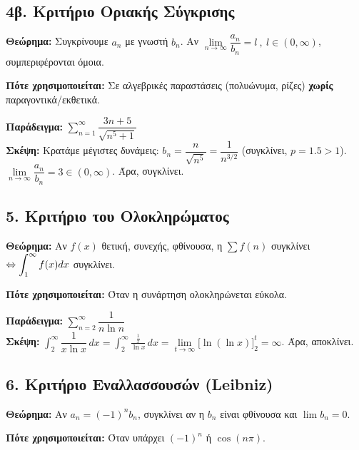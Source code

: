 \documentclass[11pt,a4paper]{article}
\newcommand{\eng}[1]{\selectlanguage{english}#1\selectlanguage{greek}}
\begin{document}
\subsection*{4β. Κριτήριο Οριακής Σύγκρισης}
\textbf{Θεώρημα:} Συγκρίνουμε $a_n$ με γνωστή $b_n$. Αν $\lim\limits_{n \to \infty} \dfrac{a_n}{b_n}=l\ ,\  l\in (0, \infty)$, συμπεριφέρονται όμοια.

\vspace{0.2cm}
\noindent \textbf{Πότε χρησιμοποιείται:} Σε αλγεβρικές παραστάσεις (πολυώνυμα, ρίζες) \textbf{χωρίς} παραγοντικά/εκθετικά.

\vspace{0.2cm}
\noindent \textbf{Παράδειγμα:} $\displaystyle\sum_{n=1}^{\infty} \dfrac{3n+5}{\sqrt{n^5+1}}$ \\
\textbf{Σκέψη:} Κρατάμε μέγιστες δυνάμεις: $b_n = \dfrac{n}{\sqrt{n^5}} = \dfrac{1}{n^{3/2}}$ (συγκλίνει, $p=1.5>1$). \\
$\lim\limits_{n \to \infty} \dfrac{a_n}{b_n} = 3 \in (0, \infty)$. Άρα, συγκλίνει.

\subsection*{5. Κριτήριο του Ολοκληρώματος}
\textbf{Θεώρημα:} Αν $f(x)$ θετική, συνεχής, φθίνουσα, η $\sum f(n)$ συγκλίνει $\Leftrightarrow \displaystyle\displaystyle\int_{1}^{\infty} f(x) dx$ συγκλίνει.

\vspace{0.2cm}
\noindent \textbf{Πότε χρησιμοποιείται:} Όταν η συνάρτηση ολοκληρώνεται εύκολα.

\vspace{0.2cm}
\noindent \textbf{Παράδειγμα:} $\displaystyle\sum_{n=2}^{\infty} \dfrac{1}{n \ln n}$ \\
\textbf{Σκέψη:} $\displaystyle\int_{2}^{\infty} \dfrac{1}{x \ln x} \, dx =\int_{2}^{\infty}{\frac{\frac{1}{x}}{\ln{x}}\, dx}= \lim\limits_{t \to \infty} \Big[ \ln(\ln x) \Big]_2^t = \infty$. Άρα, αποκλίνει.

\subsection*{6. Κριτήριο Εναλλασσουσών (\eng{Leibniz})}
\textbf{Θεώρημα:} Αν $a_n = (-1)^n b_n$, συγκλίνει αν η $b_n$ είναι φθίνουσα και $\lim b_n = 0$.

\vspace{0.2cm}
\noindent \textbf{Πότε χρησιμοποιείται:} Όταν υπάρχει $(-1)^n$ ή $\cos(n\pi)$.
\end{document}
